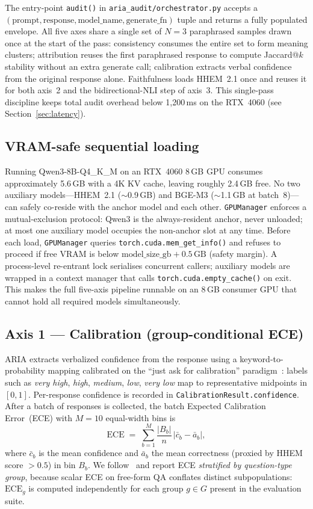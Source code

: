 \documentclass{article}
\begin{document}
The entry-point \texttt{audit()} in \texttt{aria\_audit/orchestrator.py}
accepts a $(\text{prompt}, \text{response}, \text{model\_name},
\text{generate\_fn})$ tuple and returns a fully populated envelope.
All five axes share a single set of $N = 3$ paraphrased samples drawn
once at the start of the pass: consistency consumes the entire set to
form meaning clusters; attribution reuses the first paraphrased response
to compute Jaccard@$k$ stability without an extra generate call;
calibration extracts verbal confidence from the original response alone.
Faithfulness loads HHEM~2.1 once and reuses it for both axis~2 and the
bidirectional-NLI step of axis~3.
This single-pass discipline keeps total audit overhead below 1{,}200\,ms
on the RTX~4060 (see Section~\ref{sec:latency}).

\subsection{VRAM-safe sequential loading}
\label{sec:gpu-mgr}

Running Qwen3-8B-Q4\_K\_M on an RTX~4060 8\,GB GPU consumes approximately
5.6\,GB with a 4K KV cache, leaving roughly 2.4\,GB free.
No two auxiliary models---HHEM~2.1 ($\sim$0.9\,GB) and BGE-M3
($\sim$1.1\,GB at batch~8)---can safely co-reside with the anchor model
and each other.
\texttt{GPUManager} enforces a mutual-exclusion protocol: Qwen3 is the
always-resident anchor, never unloaded; at most one auxiliary model
occupies the non-anchor slot at any time.
Before each load, \texttt{GPUManager} queries
\texttt{torch.cuda.mem\_get\_info()} and refuses to proceed if free VRAM
is below $\text{model\_size\_gb} + 0.5\,\text{GB}$ (safety margin).
A process-level re-entrant lock serialises concurrent callers; auxiliary
models are wrapped in a context manager that calls
\texttt{torch.cuda.empty\_cache()} on exit.
This makes the full five-axis pipeline runnable on an 8\,GB consumer GPU
that cannot hold all required models simultaneously.

\subsection{Axis 1 — Calibration (group-conditional ECE)}
\label{sec:axis-calibration}

ARIA extracts verbalized confidence from the response using a
keyword-to-probability mapping calibrated on the ``just ask for
calibration'' paradigm~\citep{tian2023justask}: labels such as
\emph{very high}, \emph{high}, \emph{medium}, \emph{low}, \emph{very low}
map to representative midpoints in $[0,1]$.
Per-response confidence is recorded in \texttt{CalibrationResult.confidence}.
After a batch of responses is collected, the batch Expected Calibration
Error~(ECE) with $M = 10$ equal-width bins is
\[
  \text{ECE} \;=\; \sum_{b=1}^{M} \frac{|B_b|}{n}\,\bigl|\bar{c}_b - \bar{a}_b\bigr|,
\]
where $\bar{c}_b$ is the mean confidence and $\bar{a}_b$ the mean
correctness (proxied by HHEM score $> 0.5$) in bin $B_b$.
We follow~\citet{qacalibration2025} and report ECE \emph{stratified by
question-type group}, because scalar ECE on free-form QA conflates
distinct subpopulations: $\text{ECE}_g$ is computed independently for
each group $g \in G$ present in the evaluation suite.
\end{document}
